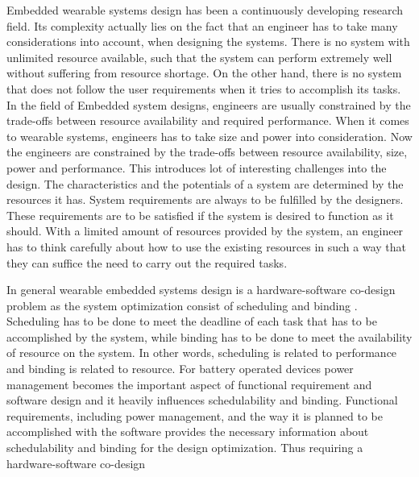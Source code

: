 Embedded wearable systems design has been a continuously developing research field. Its complexity actually lies on the fact that an engineer has to take many considerations into account, when designing the systems. There is no system with unlimited resource available, such that the system can perform extremely well without suffering from resource shortage. On the other hand, there is no system that does not follow the user requirements when it tries to accomplish its tasks. In the field of Embedded system designs, engineers are usually constrained by the trade-offs between resource availability and required performance. When it comes to wearable systems, engineers has to take size and power into consideration. Now the engineers are constrained by the trade-offs between resource availability, size, power and performance. This introduces lot of interesting challenges into the design. The characteristics and the potentials of a system are determined by the resources it has. System requirements are always to be fulfilled by the designers. These requirements are to be satisfied if the system is desired to function as it should. With a 
limited amount of resources provided by the system, an engineer has to think carefully about how to use the existing resources in such a way that they can suffice the need to carry out the required tasks. 

In general wearable embedded systems design is a hardware-software co-design problem as the system optimization consist of scheduling and binding \cite{sched_bind}. Scheduling has to be done to meet the deadline of each task that has to be accomplished by the system, while binding has to be done to meet the availability of resource on the system. In other words, scheduling is related to performance and binding is related to resource. For battery operated devices power management becomes the important aspect of functional requirement and software design and it heavily influences schedulability and binding. Functional requirements, including power management, and the way it is planned to be accomplished with the software provides the necessary information about schedulability and binding for the design optimization. Thus requiring a hardware-software co-design 

